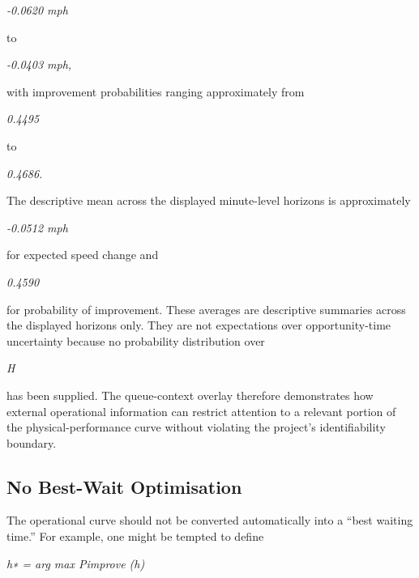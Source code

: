 \begin{center}\textit{-0.0620 mph}\end{center}

to

\begin{center}\textit{-0.0403 mph,}\end{center}

with improvement probabilities ranging approximately from

\begin{center}\textit{0.4495}\end{center}

to

\begin{center}\textit{0.4686.}\end{center}

The descriptive mean across the displayed minute-level horizons is approximately

\begin{center}\textit{-0.0512 mph}\end{center}

for expected speed change and

\begin{center}\textit{0.4590}\end{center}

for probability of improvement. These averages are descriptive summaries across the displayed horizons only. They are not expectations over opportunity-time uncertainty because no probability distribution over

\begin{center}\textit{H}\end{center}

has been supplied. The queue-context overlay therefore demonstrates how external operational information can restrict attention to a relevant portion of the physical-performance curve without violating the project's identifiability boundary.

\subsection{No Best-Wait Optimisation}
The operational curve should not be converted automatically into a ``best waiting time.'' For example, one might be tempted to define

\begin{center}\textit{h∗ = arg max Pimprove (h)}\end{center}

